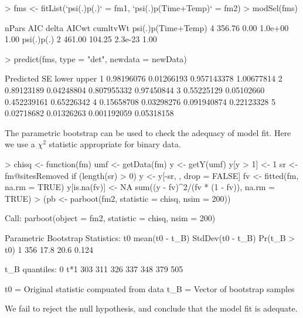 \documentclass[a4paper]{article}
\renewenvironment{Schunk}{\vspace{\topsep}}{\vspace{\topsep}}
\begin{document}
\begin{Schunk}
\begin{Sinput}
> fms <- fitList(`psi(.)p(.)` = fm1, `psi(.)p(Time+Temp)` = fm2)
> modSel(fms)
\end{Sinput}
\begin{Soutput}
                   nPars    AIC  delta   AICwt cumltvWt
psi(.)p(Time+Temp)     4 356.76   0.00 1.0e+00     1.00
psi(.)p(.)             2 461.00 104.25 2.3e-23     1.00
\end{Soutput}
\begin{Sinput}
> predict(fms, type = "det", newdata = newData)
\end{Sinput}
\begin{Soutput}
   Predicted         SE       lower      upper
1 0.98196076 0.01266193 0.957143378 1.00677814
2 0.89123189 0.04248804 0.807955332 0.97450844
3 0.55225129 0.05102660 0.452239161 0.65226342
4 0.15658708 0.03298276 0.091940874 0.22123328
5 0.02718682 0.01326263 0.001192059 0.05318158
\end{Soutput}
\end{Schunk}


The parametric bootstrap can be used to check the adequacy of model fit.
Here we use a $\chi^2$ statistic appropriate for binary data.

\begin{Schunk}
\begin{Sinput}
> chisq <- function(fm) {
     umf <- getData(fm)
     y <- getY(umf)
     y[y > 1] <- 1
     sr <- fm@sitesRemoved
     if (length(sr) > 0) 
         y <- y[-sr, , drop = FALSE]
     fv <- fitted(fm, na.rm = TRUE)
     y[is.na(fv)] <- NA
     sum((y - fv)^2/(fv * (1 - fv)), na.rm = TRUE)
 }
> (pb <- parboot(fm2, statistic = chisq, nsim = 200))
\end{Sinput}
\begin{Soutput}
Call: parboot(object = fm2, statistic = chisq, nsim = 200)

Parametric Bootstrap Statistics:
   t0 mean(t0 - t_B) StdDev(t0 - t_B) Pr(t_B > t0)
1 356           17.8             20.6        0.124

t_B quantiles:
     0% 2.5% 25% 50% 75% 97.5% 100%
t*1 303  311 326 337 348   379  505

t0 = Original statistic compuated from data
t_B = Vector of bootstrap samples
\end{Soutput}
\end{Schunk}

We fail to reject the null hypothesis, and conclude that the model fit
is adequate.


\end{document}
